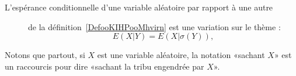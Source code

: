 \begin{description}
\item[L'espérance conditionnelle d'une variable aléatoire par rapport à une autre] de la définition~\ref{DefooKIHPooMhvirn} est une variation sur le thème :
\begin{equation}
    E(X|Y)=E(X|\sigma(Y)),
\end{equation}


\end{description}

Notons que partout, si \( X\) est une variable aléatoire, la notation «sachant \( X\)» est un raccourcis pour dire «sachant la tribu engendrée par \( X\)».
